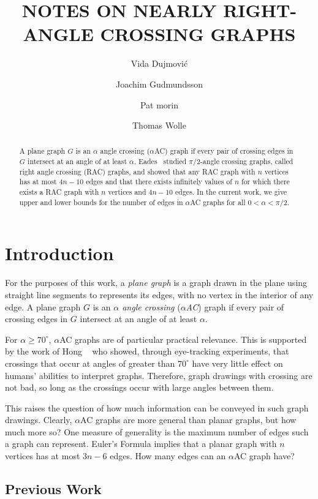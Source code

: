 \documentclass[lotsofwhite,charterfonts]{patmorin}
\title{\MakeUppercase{Notes on Nearly Right-Angle Crossing Graphs}}
\author{Vida Dujmovi\'c 
	\and Joachim Gudmundsson
	\and Pat morin
	\and Thomas Wolle}
\begin{document}
\maketitle

\begin{abstract}
A plane graph $G$ is an $\alpha$ angle crossing ($\alpha$AC) graph if
every pair of crossing edges in $G$ intersect at an angle of at least
$\alpha$.  Eades \etal\ studied $\pi/2$-angle crossing graphs, called
right angle crossing (RAC) graphs, and showed that any RAC graph with
$n$ vertices has at most $4n-10$ edges and that there exists infinitely
values of $n$ for which there exists a RAC graph with $n$ vertices and
$4n-10$ edges.  In the current work, we give upper and lower bounds for
the number of edges in $\alpha$AC graphs for all $0 < \alpha < \pi/2$.
\end{abstract}

\section{Introduction}

For the purposes of this work, a \emph{plane graph} is a graph drawn in the
plane using straight line segments to represents its edges, with no vertex
in the interior of any edge.  A plane graph $G$ is an \emph{$\alpha$ angle
crossing} (\emph{$\alpha$AC}) graph if every pair of crossing edges in $G$
intersect at an angle of at least $\alpha$.

For $\alpha\ge 70^\circ$, $\alpha$AC graphs are of particular practical
relevance. This is supported by the work of Hong \etal\ \cite{hXX} who
showed, through eye-tracking experiments, that crossings that occur at
angles of greater than $70^\circ$ have very little effect on humans'
abilities to interpret graphs.  Therefore, graph drawings with crossing are
not bad, so long as the crossings occur with large angles between them.

This raises the question of how much information can be conveyed in such
graph drawings.  Clearly, $\alpha$AC graphs are more general than planar
graphs, but how much more so?  One measure of generality is the maximum
number of edges such a graph can represent.  Euler's Formula implies that a
planar graph with $n$ vertices has at most $3n-6$ edges.  How many edges
can an $\alpha$AC graph have?

\subsection{Previous Work}
\end{document}
